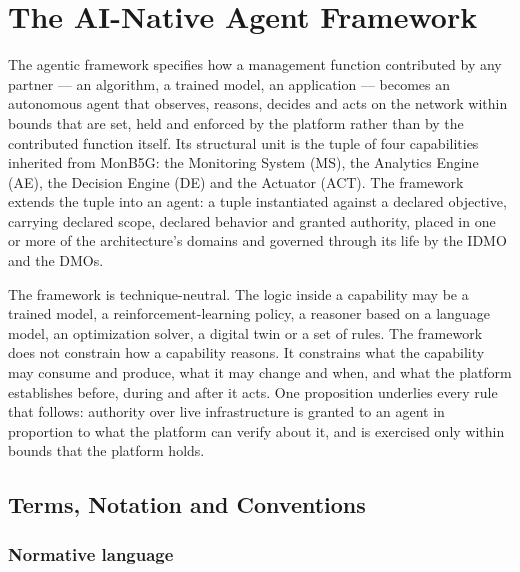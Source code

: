 
\hypertarget{the-ai-native-agent-framework}{%
\section{The AI-Native Agent Framework}\label{the-ai-native-agent-framework}}

The agentic framework specifies how a management function contributed by
any partner --- an algorithm, a trained model, an application ---
becomes an autonomous agent that observes, reasons, decides and acts on
the network within bounds that are set, held and enforced by the
platform rather than by the contributed function itself. Its structural
unit is the tuple of four capabilities inherited from MonB5G: the
Monitoring System (MS), the Analytics Engine (AE), the Decision Engine
(DE) and the Actuator (ACT). The framework extends the tuple into an
agent: a tuple instantiated against a declared objective, carrying
declared scope, declared behavior and granted authority, placed in one
or more of the architecture's domains and governed through its life by
the IDMO and the DMOs.

The framework is technique-neutral. The logic inside a capability may be
a trained model, a reinforcement-learning policy, a reasoner based on a
language model, an optimization solver, a digital twin or a set of
rules. The framework does not constrain how a capability reasons. It
constrains what the capability may consume and produce, what it may
change and when, and what the platform establishes before, during and
after it acts. One proposition underlies every rule that follows:
authority over live infrastructure is granted to an agent in proportion
to what the platform can verify about it, and is exercised only within
bounds that the platform holds.

\hypertarget{terms-notation-and-conventions}{%
\subsection{Terms, Notation and Conventions}\label{terms-notation-and-conventions}}

\hypertarget{normative-language}{%
\subsubsection{Normative language}\label{normative-language}}


